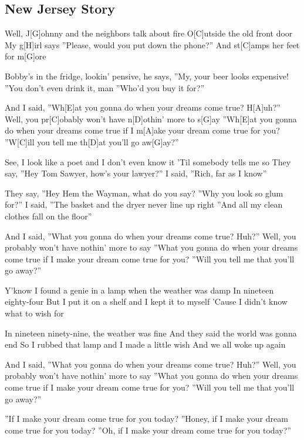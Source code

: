 \subsection*{New Jersey Story   }
\begin{guitar}
Well, J[G]ohnny and the neighbors talk about fire
O[C]utside the old front door
My g[H]irl says ''Please, would you put down the phone?''
And st[C]amps her feet for m[G]ore


Bobby's in the fridge, lookin' pensive, he says,
''My, your beer looks expensive!
''You don't even drink it, man
''Who'd you buy it for?''


And I said, ''Wh[E]at you gonna do when your dreams come true? H[A]uh?''
Well, you pr[C]obably won't have n[D]othin' more to s[G]ay
''Wh[E]at you gonna do when your dreams come true 
if I m[A]ake your dream come true for you?
''W[C]ill you tell me th[D]at you'll go aw[G]ay?''


See, I look like a poet and I don't even know it
'Til somebody tells me so
They say, ''Hey Tom Sawyer, how's your lawyer?''
I said, ''Rich, far as I know''


They say, ''Hey Hem the Wayman, what do you say?
''Why you look so glum for?''
I said, ''The basket and the dryer never line up right
''And all my clean clothes fall on the floor''


And I said, ''What you gonna do when your dreams come true? Huh?''
Well, you probably won't have nothin' more to say
''What you gonna do when your dreams come true 
if I make your dream come true for you?
''Will you tell me that you'll go away?''


Y'know I found a genie in a lamp when the weather was damp
In nineteen eighty-four
But I put it on a shelf and I kept it to myself
'Cause I didn't know what to wish for


In nineteen ninety-nine, the weather was fine
And they said the world was gonna end
So I rubbed that lamp and I made a little wish
And we all woke up again


And I said, ''What you gonna do when your dreams come true? Huh?''
Well, you probably won't have nothin' more to say
''What you gonna do when your dreams come true 
if I make your dream come true for you?
''Will you tell me that you'll go away?''


''If I make your dream come true for you today?
''Honey, if I make your dream come true for you today?
''Oh, if I make your dream come true for you today?'' 
\end{guitar}
